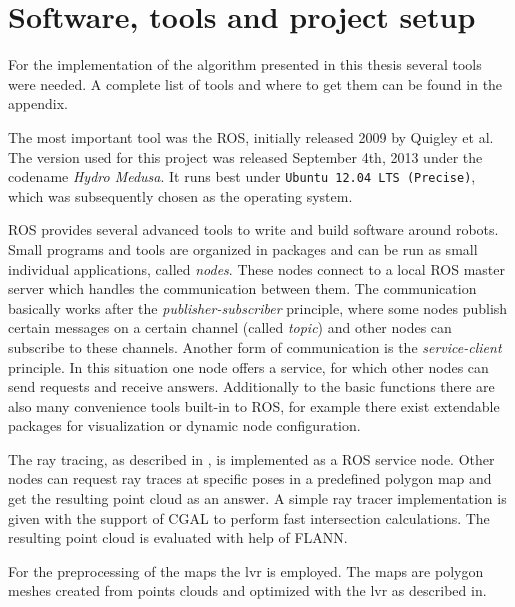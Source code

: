 \documentclass[Thesis.tex]{subfiles}
\begin{document}
\chapter{Software, tools and project setup}
For the implementation of the algorithm presented in this thesis several tools were needed. A complete list of tools and where to get them can be found in the appendix.

\smallskip

The most important tool was the \gls{ROS}, initially released 2009 by Quigley et al.\cite{ros:2009} The version used for this project was released September 4th, 2013 under the codename \emph{Hydro Medusa}. It runs best under \texttt{Ubuntu 12.04 LTS (Precise)}, which was subsequently chosen as the operating system. 

\gls{ROS} provides several advanced tools to write and build software around robots. Small programs and tools are organized in packages and can be run as small individual applications, called \emph{nodes}. These nodes connect to a local \gls{ROS} master server which handles the communication between them. The communication basically works after the \emph{publisher-subscriber} principle, where some nodes publish certain messages on a certain channel (called \emph{topic}) and other nodes can subscribe to these channels.
Another form of communication is the \emph{service-client} principle. In this situation one node offers a service, for which other nodes can send requests and receive answers. Additionally to the basic functions there are also many convenience tools built-in to \gls{ROS}, for example there exist extendable packages for visualization or dynamic node configuration.

\smallskip

The ray tracing, as described in , is implemented as a \gls{ROS} service node. Other nodes can request ray traces at specific poses in a predefined polygon map and get the resulting point cloud as an answer. A simple ray tracer implementation is given with the support of \gls{CGAL} to perform fast intersection calculations. The resulting point cloud is evaluated with help of \gls{FLANN}. 

For the preprocessing of the maps the \gls{lvr} is employed. The maps are polygon meshes created from points clouds and optimized with the \gls{lvr} as described in\cite{Wiemann:2013}.
\end{document}
